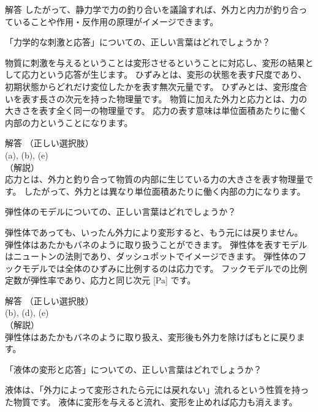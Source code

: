 \documentclass[uplatex,dvipdfmx,a4paper,11pt]{jsarticle}
\begin{document}
\begin{qlist}
\begin{itembox}[l]{解答}
        したがって、静力学で力の釣り合いを議論すれば、外力と内力が釣り合っていることや作用・反作用の原理がイメージできます。
    \end{itembox}
	\qitem 「力学的な刺激と応答」についての、正しい言葉はどれでしょうか？
		\begin{qlist2}
			\qitem 物質に刺激を与えるということは変形させるということに対応し、変形の結果として応力という応答が生じます。
			\qitem ひずみとは、変形の状態を表す尺度であり、初期状態からどれだけ変位したかを表す無次元量です。
			\qitem ひずみとは、変形度合いを表す長さの次元を持った物理量です。
			\qitem 物質に加えた外力と応力とは、力の大きさを表す全く同一の物理量です。
			\qitem 応力の表す意味は単位面積あたりに働く内部の力ということになります。
		\end{qlist2}
    \vspace{3mm}
    \begin{itembox}[l]{解答}
        （正しい選択肢）\\
        (a), (b), (e)\\
        （解説）\\
        応力とは、外力と釣り合って物質の内部に生じている力の大きさを表す物理量です。
        したがって、外力とは異なり単位面積あたりに働く内部の力になります。
    \end{itembox}
	\qitem 弾性体のモデルについての、正しい言葉はどれでしょうか？
		\begin{qlist2}
			\qitem 弾性体であっても、いったん外力により変形すると、もう元には戻りません。
			\qitem 弾性体はあたかもバネのように取り扱うことができます。
			\qitem 弾性体を表すモデルはニュートンの法則であり、ダッシュポットでイメージできます。
			\qitem 弾性体のフックモデルでは全体のひずみに比例するのは応力です。
			\qitem フックモデルでの比例定数が弾性率であり、応力と同じ次元 [Pa] です。
		\end{qlist2}
    \vspace{3mm}
    \begin{itembox}[l]{解答}
        （正しい選択肢）\\
        (b), (d), (e)\\
        （解説）\\
        弾性体はあたかもバネのように取り扱え、変形後も外力を除けばもとに戻ります。
    \end{itembox}
	\qitem 「液体の変形と応答」についての、正しい言葉はどれでしょうか？
	\begin{qlist2}
		\qitem 液体は、「外力によって変形されたら元には戻れない」流れるという性質を持った物質です。
		\qitem 液体に変形を与えると流れ、変形を止めれば応力も消えます。

\end{qlist2}
\end{qlist}
\end{document}
